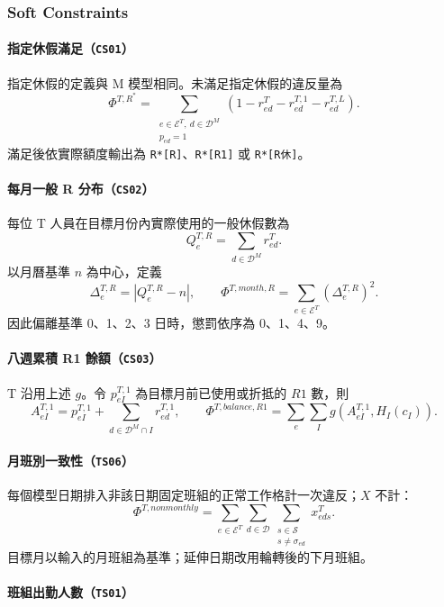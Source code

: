 \documentclass[12pt]{article}
\begin{document}
\subsubsection{Soft Constraints}

\paragraph{指定休假滿足（\texttt{CS01}）}

指定休假的定義與 M 模型相同。未滿足指定休假的違反量為
\[
  \Phi^{T,R^*}
  =
  \sum_{\substack{e\in\mathcal{E}^{T},\ d\in\mathcal{D}^{M}\\p_{ed}=1}}
  (1-r^{T}_{ed}-r^{T,1}_{ed}-r^{T,L}_{ed}).
\]
滿足後依實際額度輸出為 \texttt{R*[R]}、\texttt{R*[R1]} 或 \texttt{R*[R休]}。

\paragraph{每月一般 R 分布（\texttt{CS02}）}

每位 T 人員在目標月份內實際使用的一般休假數為
\[
  Q^{T,R}_e
  =
  \sum_{d\in\mathcal{D}^{M}}r^{T}_{ed}.
\]
以月曆基準 \(n\) 為中心，定義
\[
  \Delta^{T,R}_e
  =
  |Q^{T,R}_e-n|,
  \qquad
  \Phi^{T,month,R}
  =
  \sum_{e\in\mathcal{E}^{T}}(\Delta^{T,R}_e)^2.
\]
因此偏離基準 0、1、2、3 日時，懲罰依序為 0、1、4、9。

\paragraph{八週累積 R1 餘額（\texttt{CS03}）}

T 沿用上述 \(g\)。令 \(p^{T,1}_{eI}\) 為目標月前已使用或折抵的 \(R1\) 數，則
\[
  A^{T,1}_{eI}=p^{T,1}_{eI}+\sum_{d\in\mathcal D^M\cap I}r^{T,1}_{ed},
  \qquad
  \Phi^{T,balance,R1}=\sum_e\sum_I g(A^{T,1}_{eI},H_I(c_I)).
\]

\paragraph{月班別一致性（\texttt{TS06}）}

每個模型日期排入非該日期固定班組的正常工作格計一次違反；\(X\) 不計：
\[
  \Phi^{T,nonmonthly}
  =
  \sum_{e\in\mathcal{E}^{T}}
  \sum_{d\in\mathcal{D}}
  \sum_{\substack{s\in\mathcal{S}\\s\neq\sigma_{ed}}}x^{T}_{eds}.
\]
目標月以輸入的月班組為基準；延伸日期改用輪轉後的下月班組。

\paragraph{班組出勤人數（\texttt{TS01}）}
\end{document}
